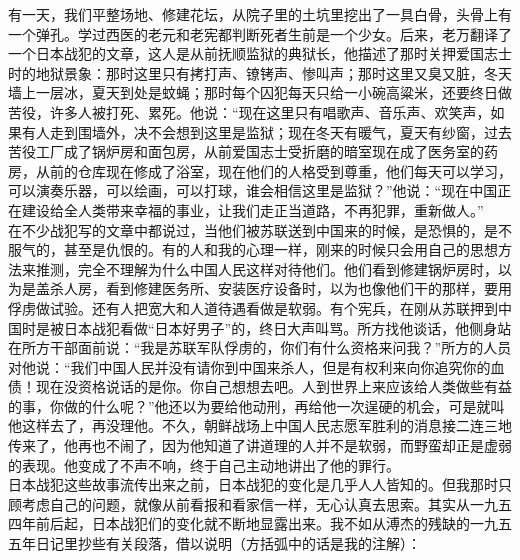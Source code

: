 有一天，我们平整场地、修建花坛，从院子里的土坑里挖出了一具白骨，头骨上有一个弹孔。学过西医的老元和老宪都判断死者生前是一个少女。后来，老万翻译了一个日本战犯的文章，这人是从前抚顺监狱的典狱长，他描述了那时关押爱国志士时的地狱景象：那时这里只有拷打声、镣铐声、惨叫声；那时这里又臭又脏，冬天墙上一层冰，夏天到处是蚊蝇；那时每个囚犯每天只给一小碗高粱米，还要终日做苦役，许多人被打死、累死。他说：“现在这里只有唱歌声、音乐声、欢笑声，如果有人走到围墙外，决不会想到这里是监狱；现在冬天有暖气，夏天有纱窗，过去苦役工厂成了锅炉房和面包房，从前爱国志士受折磨的暗室现在成了医务室的药房，从前的仓库现在修成了浴室，现在他们的人格受到尊重，他们每天可以学习，可以演奏乐器，可以绘画，可以打球，谁会相信这里是监狱？”他说：“现在中国正在建设给全人类带来幸福的事业，让我们走正当道路，不再犯罪，重新做人。”\\

在不少战犯写的文章中都说过，当他们被苏联送到中国来的时候，是恐惧的，是不服气的，甚至是仇恨的。有的人和我的心理一样，刚来的时候只会用自己的思想方法来推测，完全不理解为什么中国人民这样对待他们。他们看到修建锅炉房时，以为是盖杀人房，看到修建医务所、安装医疗设备时，以为也像他们干的那样，要用俘虏做试验。还有人把宽大和人道待遇看做是软弱。有个宪兵，在刚从苏联押到中国时是被日本战犯看做“日本好男子”的，终日大声叫骂。所方找他谈话，他侧身站在所方干部面前说：“我是苏联军队俘虏的，你们有什么资格来问我？”所方的人员对他说：“我们中国人民并没有请你到中国来杀人，但是有权利来向你追究你的血债！现在没资格说话的是你。你自己想想去吧。人到世界上来应该给人类做些有益的事，你做的什么呢？”他还以为要给他动刑，再给他一次逞硬的机会，可是就叫他这样去了，再没理他。不久，朝鲜战场上中国人民志愿军胜利的消息接二连三地传来了，他再也不闹了，因为他知道了讲道理的人并不是软弱，而野蛮却正是虚弱的表现。他变成了不声不响，终于自己主动地讲出了他的罪行。\\

日本战犯这些故事流传出来之前，日本战犯的变化是几乎人人皆知的。但我那时只顾考虑自己的问题，就像从前看报和看家信一样，无心认真去思索。其实从一九五四年前后起，日本战犯们的变化就不断地显露出来。我不如从溥杰的残缺的一九五五年日记里抄些有关段落，借以说明（方括弧中的话是我的注解）：\\

